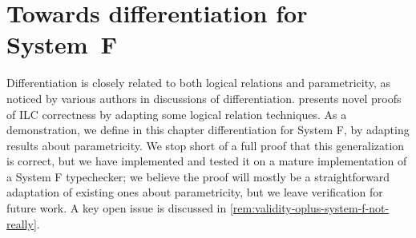 









\def\deriveDefCore{%
\begin{align*}
  \ensuremath{\Derive{\lambda (\Varid{x}\typcolon\sigma)\to \Varid{t}}} &= \ensuremath{\lambda (\Varid{x}\typcolon\sigma)\;(\Varid{dx}\typcolon\Delta \sigma)\to \Derive{\Varid{t}}} \\
  \ensuremath{\Derive{\Varid{s}\;\Varid{t}}} &= \ensuremath{\Derive{\Varid{s}}\;\Varid{t}\;\Derive{\Varid{t}}} \\
  \ensuremath{\Derive{\Varid{x}}} &= \ensuremath{\Varid{dx}} \\
  \ensuremath{\Derive{\Varid{c}}} &= \ensuremath{\DeriveConst{\Varid{c}}}
\end{align*}
}









\chapter{Towards differentiation for System~F}
\label{ch:diff-parametricity-system-f}
Differentiation is closely related to both logical relations and parametricity,
as noticed by various authors in discussions of differentiation. 
presents novel proofs of ILC correctness by adapting some logical relation techniques.
As a demonstration, we
define in this chapter differentiation for System F, by adapting results about parametricity.
%
We stop short of a full proof that this generalization is correct, but we have
implemented and tested it on a mature implementation of a System F typechecker;
we believe the proof will mostly be a straightforward adaptation of existing ones about
parametricity, but we leave verification for future work.
A key open issue is discussed in \cref{rem:validity-oplus-system-f-not-really}.



